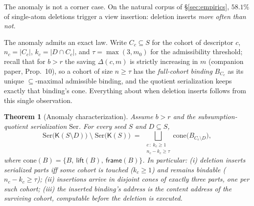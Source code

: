 \documentclass[11pt]{article}
\newtheorem{theorem}{Theorem}
\theoremstyle{definition}
\theoremstyle{remark}
\newcommand{\K}{\mathsf{K}}
\newcommand{\Up}{\mathrm{Up}}
\newcommand{\supp}{\mathrm{supp}}
\newcommand{\diffop}{\setminus}
\newcommand{\sub}{\subseteq}
\begin{document}
The anomaly is not a corner case. On the natural corpus of \S\ref{sec:empirics}, $58.1\%$ of single-atom deletions trigger a view insertion: deletion inserts \emph{more often than not}.


The anomaly admits an exact law. Write $C_c \sub S$ for the cohort of
descriptor $c$, $n_c = |C_c|$, $k_c = |D \cap C_c|$, and
$\tau = \max(3, m_0)$ for the admissibility threshold; recall that for
$b > r$ the saving $\Delta(c,m)$ is strictly increasing in $m$
(companion paper, Prop.~10), so a cohort of size $n \ge \tau$ has the
\emph{full-cohort binding} $B_{C_c}$ as its unique $\sub$-maximal
admissible binding, and the quotient serialization keeps exactly that
binding's cone. Everything about when deletion inserts follows from
this single observation.

\begin{theorem}[Anomaly characterization]\label{thm:anomalychar}
Assume $b > r$ and the subsumption-quotient serialization
$\mathrm{Ser}$. For every seed $S$ and $D \sub S$,
\[
\mathrm{Ser}\big(\K(S \diffop D)\big) \;\setminus\;
\mathrm{Ser}\big(\K(S)\big)
\;=\;
\bigsqcup_{\substack{c \,:\; k_c \ge 1 \\ n_c - k_c \ge \tau}}
\mathrm{cone}\big(B_{C_c \diffop D}\big),
\]
where $\mathrm{cone}(B) = \{B,\ \mathsf{lift}(B),\ \mathsf{frame}(B)\}$.
In particular: (i) deletion inserts serialized parts \emph{iff} some
cohort is touched ($k_c \ge 1$) and remains bindable
($n_c - k_c \ge \tau$); (ii) insertions arrive in disjoint cones of
exactly three parts, one per such cohort; (iii) the inserted binding's
address is the content address of the surviving cohort, computable
before the deletion is executed.
\end{theorem}
\end{document}
